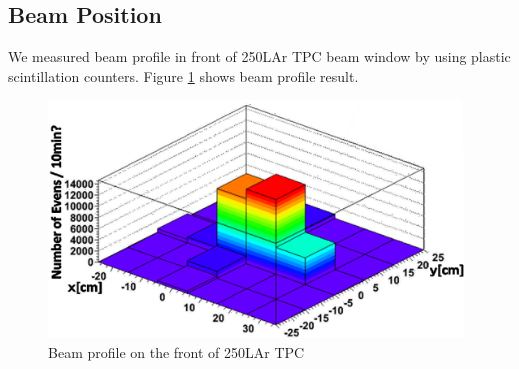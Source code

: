    \subsection{Beam Position}
   We measured beam profile in front of 250LAr TPC beam window by using plastic scintillation counters.
   Figure \ref{beamprofile_250L} shows beam profile result.
   
   
   \begin{figure}[!htb]
  \centering
  \centering
  \includegraphics[width=11cm,clip]{./fig/BeamProfile3.eps}
  \caption{Beam profile on the front of 250LAr TPC}
  \label{beamprofile_250L}
\end{figure}

